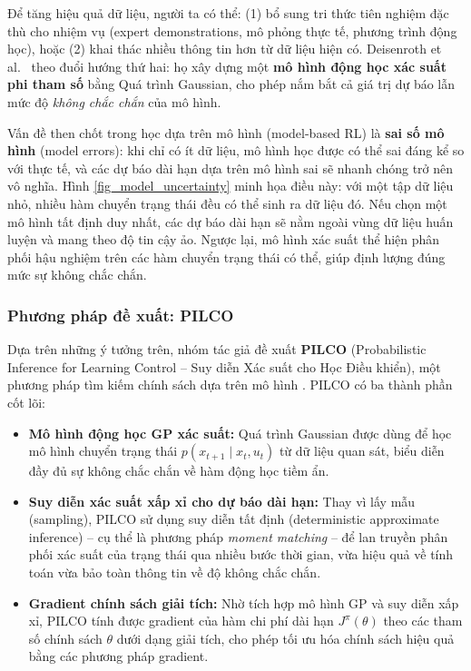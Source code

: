 Để tăng hiệu quả dữ liệu, người ta có thể: (1) bổ sung tri thức tiên nghiệm đặc thù cho nhiệm vụ (expert demonstrations, mô phỏng thực tế, phương trình động học), hoặc (2) khai thác nhiều thông tin hơn từ dữ liệu hiện có. Deisenroth et al.\ \cite{Deisenroth_2015} theo đuổi hướng thứ hai: họ xây dựng một \textbf{mô hình động học xác suất phi tham số} bằng Quá trình Gaussian, cho phép nắm bắt cả giá trị dự báo lẫn mức độ \textit{không chắc chắn} của mô hình.
\medskip

Vấn đề then chốt trong học dựa trên mô hình (model-based RL) là \textbf{sai số mô hình} (model errors): khi chỉ có ít dữ liệu, mô hình học được có thể sai đáng kể so với thực tế, và các dự báo dài hạn dựa trên mô hình sai sẽ nhanh chóng trở nên vô nghĩa. Hình \ref{fig_model_uncertainty} minh họa điều này: với một tập dữ liệu nhỏ, nhiều hàm chuyển trạng thái đều có thể sinh ra dữ liệu đó. Nếu chọn một mô hình tất định duy nhất, các dự báo dài hạn sẽ nằm ngoài vùng dữ liệu huấn luyện và mang theo độ tin cậy ảo. Ngược lại, mô hình xác suất thể hiện phân phối hậu nghiệm trên các hàm chuyển trạng thái có thể, giúp định lượng đúng mức sự không chắc chắn.
\medskip

\subsubsection{Phương pháp đề xuất: PILCO}
\label{SUB_SUB_SEC_pilco}

Dựa trên những ý tưởng trên, nhóm tác giả đề xuất \textbf{PILCO} (Probabilistic Inference for Learning Control -- Suy diễn Xác suất cho Học Điều khiển), một phương pháp tìm kiếm chính sách dựa trên mô hình \cite{Deisenroth_2015}. PILCO có ba thành phần cốt lõi:
\begin{itemize}
    \item[(1)] \textbf{Mô hình động học GP xác suất:} Quá trình Gaussian được dùng để học mô hình chuyển trạng thái $p(x_{t+1} \mid x_t, u_t)$ từ dữ liệu quan sát, biểu diễn đầy đủ sự không chắc chắn về hàm động học tiềm ẩn.
    \item[(2)] \textbf{Suy diễn xác suất xấp xỉ cho dự báo dài hạn:} Thay vì lấy mẫu (sampling), PILCO sử dụng suy diễn tất định (deterministic approximate inference) -- cụ thể là phương pháp \textit{moment matching} -- để lan truyền phân phối xác suất của trạng thái qua nhiều bước thời gian, vừa hiệu quả về tính toán vừa bảo toàn thông tin về độ không chắc chắn.
    \item[(3)] \textbf{Gradient chính sách giải tích:} Nhờ tích hợp mô hình GP và suy diễn xấp xỉ, PILCO tính được gradient của hàm chi phí dài hạn $J^\pi(\theta)$ theo các tham số chính sách $\theta$ dưới dạng giải tích, cho phép tối ưu hóa chính sách hiệu quả bằng các phương pháp gradient.
\end{itemize}
\medskip

